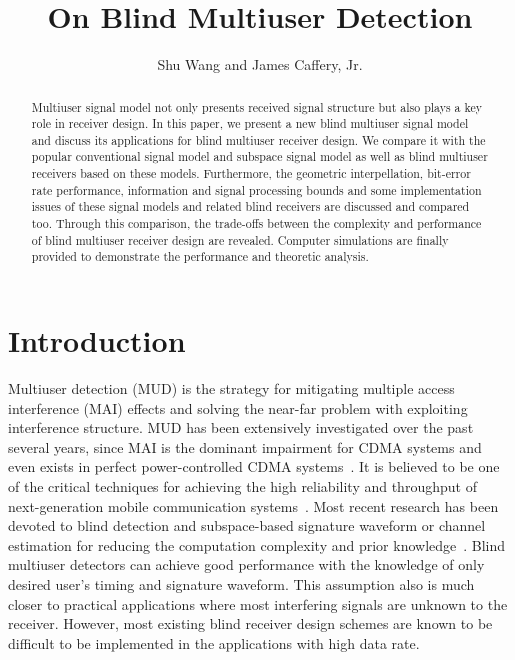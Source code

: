 \documentclass[a4paper,10pt,fleqn, twocolumn]{IEEETran}
\title{On Blind Multiuser Detection}
\author{Shu Wang and James Caffery, Jr.}
\date{}
\begin{document}
\maketitle
\begin{abstract}\small
Multiuser signal model not only presents received signal structure
but also plays a key role in receiver design. In this paper, we
present a new blind multiuser signal model and discuss its
applications for blind multiuser receiver design. We compare it
with the popular conventional signal model and subspace signal
model as well as blind multiuser receivers based on these models.
Furthermore, the geometric interpellation, bit-error rate
performance, information and signal processing bounds and some
implementation issues of these signal models and related blind
receivers are discussed and compared too. Through this comparison,
the trade-offs between the complexity and performance of blind
multiuser receiver design are revealed. Computer simulations are
finally provided to demonstrate the performance and theoretic
analysis.
\end{abstract}

\section{Introduction}
Multiuser detection (MUD) is the strategy for mitigating multiple
access interference (MAI) effects and solving the near-far problem
with exploiting interference structure. MUD has been extensively
investigated over the past several years, since MAI is the
dominant impairment for CDMA systems and even exists in perfect
power-controlled CDMA systems~\cite{Verd98}. It is believed to be
one of the critical techniques for achieving the high reliability
and throughput of next-generation mobile communication
systems~\cite{Andr05}. Most recent research has been devoted to
blind detection and subspace-based signature waveform or channel
estimation for reducing the computation complexity and prior
knowledge~\cite{Madh94,Honi95,Torl97,Wang98,Zhang02,Wang05B}.
Blind multiuser detectors can achieve good performance with the
knowledge of only desired user's timing and signature waveform.
This assumption also is much closer to practical applications
where most interfering signals are unknown to the receiver.
However, most existing blind receiver design schemes are known to
be difficult to be implemented in the applications with high data
rate.
\end{document}

